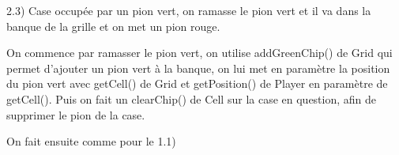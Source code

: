 2.3) Case occupée par un pion vert, on ramasse le pion vert et il va dans la banque de la grille et on met un pion rouge.

On commence par ramasser le pion vert, on utilise addGreenChip() de Grid qui permet d'ajouter un pion vert à la banque, on lui met en paramètre la position du pion vert avec getCell() de Grid
et getPosition() de Player en paramètre de getCell(). Puis on fait un clearChip() de Cell sur la case en question, afin de supprimer le pion de la case.

On fait ensuite comme pour le 1.1)

